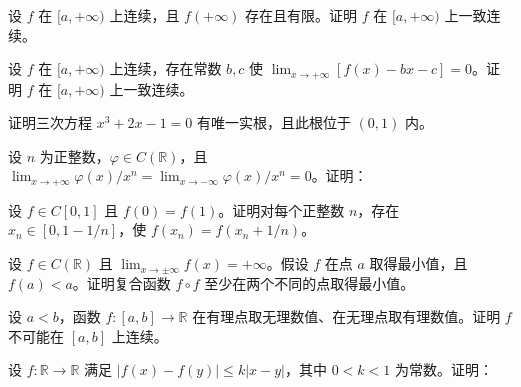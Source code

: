 \newpage
\noindent\begin{minipage}{\textwidth}
设 $f$ 在 $[a,+\infty)$ 上连续，且 $f(+\infty)$ 存在且有限。证明 $f$ 在 $[a,+\infty)$ 上一致连续。
\end{minipage}\par\vfill
\noindent\begin{minipage}{\textwidth}
设 $f$ 在 $[a,+\infty)$ 上连续，存在常数 $b,c$ 使 $\lim_{x\to+\infty}[f(x)-bx-c]=0$。证明 $f$ 在 $[a,+\infty)$ 上一致连续。
\end{minipage}\par\vfill
\noindent\begin{minipage}{\textwidth}
证明三次方程 $x^3+2x-1=0$ 有唯一实根，且此根位于 $(0,1)$ 内。
\end{minipage}\par\vfill
\newpage
\noindent\begin{minipage}{\textwidth}
设 $n$ 为正整数，$\varphi\in C(\mathbb R)$，且 $\lim_{x\to+\infty}\varphi(x)/x^n=\lim_{x\to-\infty}\varphi(x)/x^n=0$。证明：
\end{minipage}\par\vfill
\noindent\begin{minipage}{\textwidth}
设 $f\in C[0,1]$ 且 $f(0)=f(1)$。证明对每个正整数 $n$，存在 $x_n\in[0,1-1/n]$，使 $f(x_n)=f(x_n+1/n)$。
\end{minipage}\par\vfill
\noindent\begin{minipage}{\textwidth}
设 $f\in C(\mathbb R)$ 且 $\lim_{x\to\pm\infty}f(x)=+\infty$。假设 $f$ 在点 $a$ 取得最小值，且 $f(a)<a$。证明复合函数 $f\circ f$ 至少在两个不同的点取得最小值。
\end{minipage}\par\vfill
\newpage
\noindent\begin{minipage}{\textwidth}
设 $a<b$，函数 $f:[a,b]\to\mathbb R$ 在有理点取无理数值、在无理点取有理数值。证明 $f$ 不可能在 $[a,b]$ 上连续。
\end{minipage}\par\vfill
\noindent\begin{minipage}{\textwidth}
设 $f:\mathbb R\to\mathbb R$ 满足 $|f(x)-f(y)|\le k|x-y|$，其中 $0<k<1$ 为常数。证明：
\end{minipage}\par\vfill
